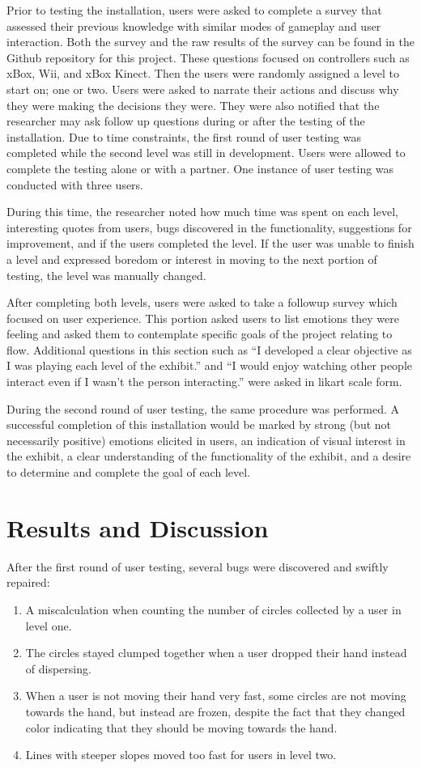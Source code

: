 \documentclass[10pt,twocolumn]{article}
\begin{document}
Prior to testing the installation, users were asked to complete a survey that assessed their previous knowledge with similar modes of gameplay and user interaction.  Both the survey and the raw results of the survey can be found in the Github repository for this project.  These questions focused on controllers such as xBox, Wii, and xBox Kinect. Then the users were randomly assigned a level to start on; one or two.  Users were asked to narrate their actions and discuss why they were making the decisions they were.  They were also notified that the researcher may ask follow up questions during or after the testing of the installation. Due to time constraints, the first round of user testing was completed while the second level was still in development.  Users were allowed to complete the testing alone or with a partner.  One instance of user testing was conducted with three users. 

During this time, the researcher noted how much time was spent on each level, interesting quotes from users, bugs discovered in the functionality, suggestions for improvement, and if the users completed the level.  If the user was unable to finish a level and expressed boredom or interest in moving to the next portion of testing, the level was manually changed. 

After completing both levels, users were asked to take a followup survey which focused on user experience.  This portion asked users to list emotions they were feeling and asked them to contemplate specific goals of the project relating to flow.  Additional questions in this section such as ``I developed a clear objective as I was playing each level of the exhibit.'' and ``I would enjoy watching other people interact even if I wasn't the person interacting.'' were asked in likart scale form. 

During the second round of user testing, the same procedure was performed. A successful completion of this installation would be marked by strong (but not necessarily positive) emotions elicited in users, an indication of visual interest in the exhibit, a clear understanding of the functionality of the exhibit, and a desire to determine and complete the goal of each level.  

\section{Results and Discussion}
After the first round of user testing, several bugs were discovered and swiftly repaired:
\begin{enumerate}
  \item A miscalculation when counting the number of circles collected by a user in level one.
  \item The circles stayed clumped together when a user dropped their hand instead of dispersing. 
  \item When a user is not moving their hand very fast, some circles are not moving towards the hand, but instead are frozen, despite the fact that they changed color indicating that they should be moving towards the hand. 
  \item Lines with steeper slopes moved too fast for users in level two. 
\end{enumerate}
\end{document}
